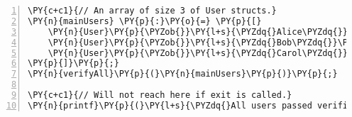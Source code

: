 \begin{Verbatim}[commandchars=\\\{\},numbers=left,firstnumber=1,stepnumber=1]
\PY{c+c1}{// An array of size 3 of User structs.}
\PY{n}{mainUsers} \PY{p}{:}\PY{o}{=} \PY{p}{[}
    \PY{n}{User}\PY{p}{\PYZob{}}\PY{l+s}{\PYZdq{}Alice\PYZdq{}}\PY{p}{,} \PY{l+m}{22}\PY{p}{\PYZcb{}}\PY{p}{,}
    \PY{n}{User}\PY{p}{\PYZob{}}\PY{l+s}{\PYZdq{}Bob\PYZdq{}}\PY{p}{,} \PY{l+m}{17}\PY{p}{\PYZcb{}}\PY{p}{,}
    \PY{n}{User}\PY{p}{\PYZob{}}\PY{l+s}{\PYZdq{}Carol\PYZdq{}}\PY{p}{,} \PY{l+m}{30}\PY{p}{\PYZcb{}}
\PY{p}{]}\PY{p}{;}
\PY{n}{verifyAll}\PY{p}{(}\PY{n}{mainUsers}\PY{p}{)}\PY{p}{;}

\PY{c+c1}{// Will not reach here if exit is called.}
\PY{n}{printf}\PY{p}{(}\PY{l+s}{\PYZdq{}All users passed verification.\PYZbs{}n\PYZdq{}}\PY{p}{)}\PY{p}{;}
\end{Verbatim}
